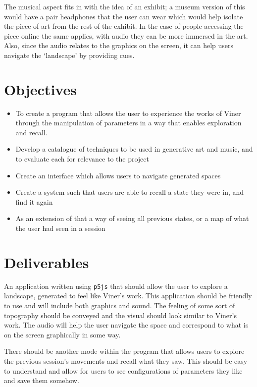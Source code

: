 The musical aspect fits in with the idea of an exhibit; a museum version of this
would have a pair headphones that the user can wear which would help isolate the
piece of art from the rest of the exhibit. In the case of people accessing the
piece online the same applies, with audio they can be more immersed in the art.
Also, since the audio relates to the graphics on the screen, it can help users
navigate the `landscape' by providing cues.

\section{Objectives}
\begin{itemize}
    \item To create a program that allows the user to experience the works of
        Viner through the manipulation of parameters in a way that enables
        exploration and recall.
    \item Develop a catalogue of techniques to be used in generative art and
        music, and to evaluate each for relevance to the project
    \item Create an interface which allows users to navigate generated spaces
    \item Create a system such that users are able to recall a state they were
        in, and find it again
    \item As an extension of that a way of seeing all previous states, or a map
        of what the user had seen in a session
\end{itemize}

\section{Deliverables}
An application written using \verb|p5js| that should allow the user to explore a
landscape, generated to feel like Viner's work. This application should be
friendly to use and will include both graphics and sound. The feeling of some
sort of topography should be conveyed and the visual should look similar to
Viner's work. The audio will help the user navigate the space and correspond to
what is on the screen graphically in some way.

There should be another mode within the program that allows users to explore the
previous session's movements and recall what they saw. This should be easy to
understand and allow for users to see configurations of parameters they like and
save them somehow.

